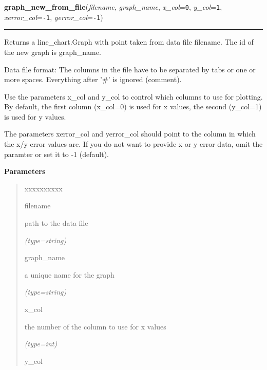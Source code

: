 \hspace{.8\funcindent}\begin{boxedminipage}{\funcwidth}

    \raggedright \textbf{graph\_new\_from\_file}(\textit{filename}, \textit{graph\_name}, \textit{x\_col}={\tt 0}, \textit{y\_col}={\tt 1}, \textit{xerror\_col}={\tt -1}, \textit{yerror\_col}={\tt -1})

    \vspace{-1.5ex}

    \rule{\textwidth}{0.5\fboxrule}
\setlength{\parskip}{2ex}
    Returns a line\_chart.Graph with point taken from data file filename. 
    The id of the new graph is graph\_name.

    Data file format: The columns in the file have to be separated by tabs 
    or one or more spaces. Everything after '\#' is ignored (comment).

    Use the parameters x\_col and y\_col to control which columns to use 
    for plotting. By default, the first column (x\_col=0) is used for x 
    values, the second (y\_col=1) is used for y values.

    The parameters xerror\_col and yerror\_col should point to the column 
    in which the x/y error values are. If you do not want to provide x or y
    error data, omit the paramter or set it to -1 (default).

\setlength{\parskip}{1ex}
      \textbf{Parameters}
      \vspace{-1ex}

      \begin{quote}
        \begin{Ventry}{xxxxxxxxxx}

          \item[filename]

          path to the data file

            {\it (type=string)}

          \item[graph\_name]

          a unique name for the graph

            {\it (type=string)}

          \item[x\_col]

          the number of the column to use for x values

            {\it (type=int)}

          \item[y\_col]


\end{Ventry}
\end{quote}
\end{boxedminipage}
